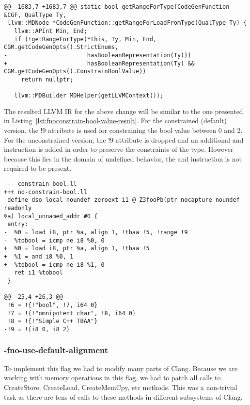 \begin{lstlisting}[style=Cstyle, caption={-fnoconstrain-bool-value
implementation}, label={lst:fnoconstrain-bool-value}]
@@ -1683,7 +1683,7 @@ static bool getRangeForType(CodeGenFunction &CGF, QualType Ty,
 llvm::MDNode *CodeGenFunction::getRangeForLoadFromType(QualType Ty) {
   llvm::APInt Min, End;
   if (!getRangeForType(*this, Ty, Min, End, CGM.getCodeGenOpts().StrictEnums,
-                       hasBooleanRepresentation(Ty)))
+                       hasBooleanRepresentation(Ty) && CGM.getCodeGenOpts().ConstrainBoolValue))
     return nullptr;

   llvm::MDBuilder MDHelper(getLLVMContext());
\end{lstlisting}

The resulted LLVM IR for the above change will be similar to the one presented
in Listing~\ref{lst:fnoconstrain-bool-value-result}. For the constrained
(default) version, the !9 attribute is used for constraining the bool value
between 0 and 2. For the unconstrained version, the !9 attribute is dropped and
an additional and instruction is added in order to preserve the constraints of
the type. However because this lies in the domain of undefined behavior, the and
instruction is not required to be present.

\begin{lstlisting}[style=Cstyle, caption={-fnoconstrain-bool-value
results}, label={lst:fnoconstrain-bool-value-result}]
--- constrain-bool.ll
+++ no-constrain-bool.ll
 define dso_local noundef zeroext i1 @_Z3fooPb(ptr nocapture noundef readonly
%a) local_unnamed_addr #0 {
 entry:
-  %0 = load i8, ptr %a, align 1, !tbaa !5, !range !9
-  %tobool = icmp ne i8 %0, 0
+  %0 = load i8, ptr %a, align 1, !tbaa !5
+  %1 = and i8 %0, 1
+  %tobool = icmp ne i8 %1, 0
   ret i1 %tobool
 }

@@ -25,4 +26,3 @@
 !6 = !{!"bool", !7, i64 0}
 !7 = !{!"omnipotent char", !8, i64 0}
 !8 = !{!"Simple C++ TBAA"}
-!9 = !{i8 0, i8 2}
\end{lstlisting}

\subsubsection{-fno-use-default-alignment}

To implement this flag we had to modify many parts of Clang. Because we are
working with memory operations in this flag, we had to patch all calls to
CreateStore, CreateLoad, CreateMemCpy, etc  methods. This was
a non-trivial task as there are tens of calls to these methods in different
subsystems of Clang.

